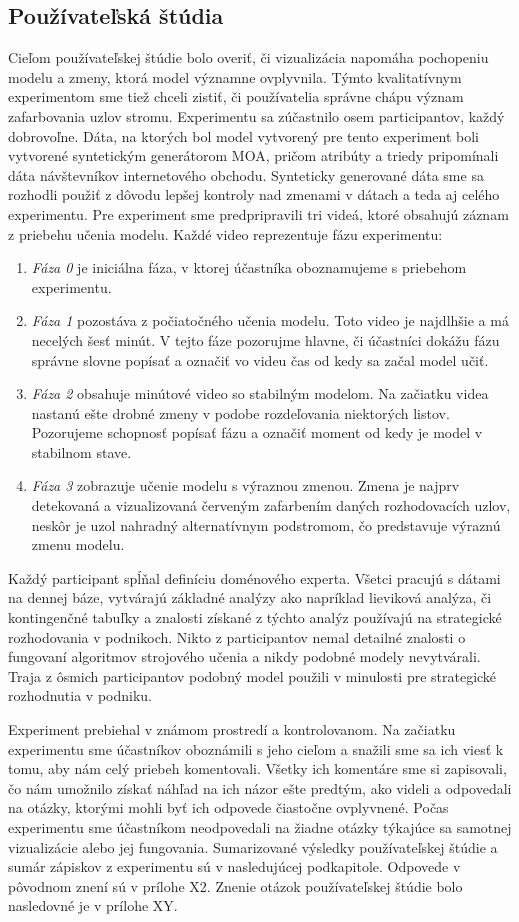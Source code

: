 \subsection{Používateľská štúdia}
Cieľom používateľskej štúdie bolo overiť, či vizualizácia napomáha pochopeniu modelu a zmeny, ktorá model významne ovplyvnila. Týmto kvalitatívnym experimentom sme tiež chceli zistiť, či používatelia správne chápu význam zafarbovania uzlov stromu. Experimentu sa zúčastnilo osem participantov, každý dobrovoľne. Dáta, na ktorých bol model vytvorený pre tento experiment boli vytvorené syntetickým generátorom MOA, pričom atribúty a triedy pripomínali dáta návštevníkov internetového obchodu. Synteticky generované dáta sme sa rozhodli použiť z dôvodu lepšej kontroly nad zmenami v dátach a teda aj celého experimentu. Pre experiment sme predpripravili tri videá, ktoré obsahujú záznam z priebehu učenia modelu. Každé video reprezentuje fázu experimentu:
\begin{enumerate}
	\item \textit{Fáza 0} je iniciálna fáza, v ktorej účastníka oboznamujeme s priebehom experimentu.
	\item \textit{Fáza 1} pozostáva z počiatočného učenia modelu. Toto video je najdlhšie a má necelých šesť minút. V tejto fáze pozorujme hlavne, či účastníci dokážu fázu správne slovne popísať a označiť vo videu čas od kedy sa začal model učiť.
	\item \textit{Fáza 2} obsahuje minútové video so stabilným modelom. Na začiatku videa nastanú ešte drobné zmeny v podobe rozdeľovania niektorých listov. Pozorujeme schopnosť popísať fázu a označiť moment od kedy je model v stabilnom stave.
	\item \textit{Fáza 3} zobrazuje učenie modelu s výraznou zmenou. Zmena je najprv detekovaná a vizualizovaná červeným zafarbením daných rozhodovacích uzlov, neskôr je uzol nahradný alternatívnym podstromom, čo predstavuje výraznú zmenu modelu.
\end{enumerate}
Každý participant spĺňal definíciu doménového experta. Všetci pracujú s dátami na dennej báze, vytvárajú základné analýzy ako napríklad lieviková analýza, či kontingenčné tabuľky a znalosti získané z týchto analýz používajú na strategické rozhodovania v podnikoch. Nikto z participantov nemal detailné znalosti o fungovaní algoritmov strojového učenia a nikdy podobné modely nevytvárali. Traja z ôsmich participantov podobný model použili v minulosti pre strategické rozhodnutia v podniku.
\par
Experiment prebiehal v známom prostredí a kontrolovanom. Na začiatku experimentu sme účastníkov oboznámili s jeho cieľom a snažili sme sa ich viesť k tomu, aby nám celý priebeh komentovali. Všetky ich komentáre sme si zapisovali, čo nám umožnilo získať náhľad na ich názor ešte predtým, ako videli a odpovedali na otázky, ktorými mohli byť ich odpovede čiastočne ovplyvnené. Počas experimentu sme účastníkom neodpovedali na žiadne otázky týkajúce sa samotnej vizualizácie alebo jej fungovania. Sumarizované výsledky používateľskej štúdie a sumár zápiskov z experimentu sú v nasledujúcej podkapitole. Odpovede v pôvodnom znení sú v prílohe X2. Znenie otázok používateľskej štúdie bolo nasledovné je v prílohe XY.
